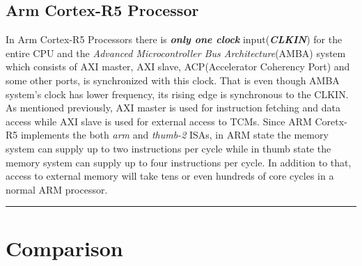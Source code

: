 \documentclass[a4paper,11pt]{article}
\begin{document}
\subsection{Arm Cortex-R5 Processor}
In Arm Cortex-R5 Processors there is \textbf{\textit{only one clock}} input(\textbf{\textit{CLKIN}}) for the entire CPU and the \textit{Advanced Microcontroller Bus Architecture}(AMBA) system which consists of AXI master, AXI slave, ACP(Accelerator Coherency Port) and some other ports, is synchronized with this clock. That is even though AMBA system's clock has lower frequency, its rising edge is synchronous to the CLKIN. As mentioned previously, AXI master is used for instruction fetching and data access while AXI slave is used for external access to TCMs. Since ARM Coretx-R5 implements the both \textit{arm} and \textit{thumb-2} ISAs, in ARM state the memory system can supply up to two instructions per cycle while in thumb state the memory system can supply up to four instructions per cycle. In addition to that, access to external memory will take tens or even hundreds of core cycles in a normal ARM processor.




\vspace{1cm}\hrule

\section{Comparison}
\end{document}
